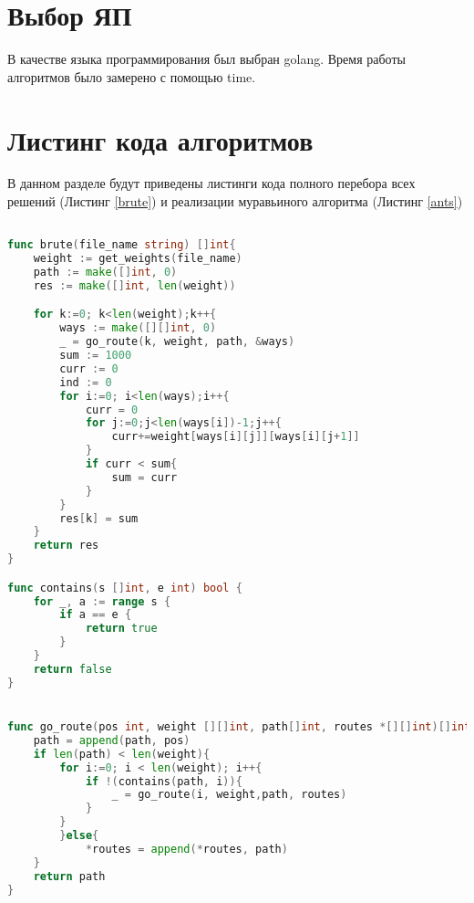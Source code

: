 \documentclass[12pt]{report}
\begin{document}
\section{Выбор ЯП}
В качестве языка программирования был выбран golang.
Время работы алгоритмов было замерено с помощью time. 
\section{Листинг кода алгоритмов}
В данном разделе будут приведены листинги кода полного перебора всех решений (Листинг \ref{brute}) и реализации муравьиного алгоритма (Листинг \ref{ants})
\begin{lstlisting}[label=brute,caption = Перебор всех возможных вариантов, language = go]

func brute(file_name string) []int{
	weight := get_weights(file_name)
	path := make([]int, 0)
	res := make([]int, len(weight))

	for k:=0; k<len(weight);k++{
		ways := make([][]int, 0)
		_ = go_route(k, weight, path, &ways)
		sum := 1000
		curr := 0
		ind := 0
		for i:=0; i<len(ways);i++{
			curr = 0
			for j:=0;j<len(ways[i])-1;j++{
				curr+=weight[ways[i][j]][ways[i][j+1]]
			}
			if curr < sum{
				sum = curr
			}
		}
		res[k] = sum
	}
	return res
}

func contains(s []int, e int) bool {
	for _, a := range s {
		if a == e {
			return true
		}
	}
	return false
}


func go_route(pos int, weight [][]int, path[]int, routes *[][]int)[]int{
	path = append(path, pos)
	if len(path) < len(weight){
		for i:=0; i < len(weight); i++{
			if !(contains(path, i)){
				_ = go_route(i, weight,path, routes)
			}
		}
		}else{
			*routes = append(*routes, path)
	}
	return path
}
\end{lstlisting}
\end{document}
